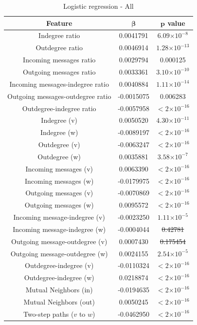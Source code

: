 \documentclass[conference]{IEEEtran}
\providecommand{\e}[1]{\ensuremath{\times 10^{#1}}}
\begin{document}
\begin{table}[!t]
\renewcommand{\arraystretch}{1.3}
\caption{Logistic regression - All}
\label{table_recresults_lograll3}
\centering
\begin{tabular}{|c||c|c|}
\hline
\bf{Feature} & $\mathbf{\beta}$ & $\mathbf{p}$ value \\
\hline
Indegree ratio     &    0.0041791  & $6.09\e{-8}$  \\
Outdegree ratio    & 0.0046914 & $1.28\e{-13}$ \\
Incoming messages ratio    &   0.0029794  & 0.000125 \\
Outgoing messages ratio   &   0.0033361  & $3.10\e{-10}$ \\
Incoming messages-indegree ratio & 0.0040884 &  $1.11\e{-14}$ \\
Outgoing messages-outdegree ratio &  -0.0015075 &  0.006283 \\
Outdegree-indegree ratio  &   -0.0057958 & $< 2 \e{-16} $\\
\hline
Indegree (v) & 0.0050520 & $ 4.30 \e{-11}$ \\
Indegree (w) & -0.0089197 & $<2 \e{-16} $ \\
Outdegree (v) & -0.0063247 & $<2 \e{-16}$ \\
Outdegree (w) & 0.0035881 & $3.58\e{-7}$ \\
Incoming messages (v) & 0.0063390 & $<2 \e{-16} $ \\
Incoming messages (w) & -0.0179975 & $<2 \e{-16} $ \\
Outgoing messages (v) & -0.0070869 & $<2 \e{-16} $\\
Outgoing messages (w) & 0.0095572 & $<2 \e{-16} $ \\
Incoming message-indegree (v) & -0.0023250 & $1.11\e{-5}$ \\
Incoming message-indegree (w) & -0.0004044 & \sout{0.42781} \\
Outgoing message-outdegree (v) & 0.0007430 & \sout{0.175454}  \\
Outgoing message-outdegree (w) & 0.0024155 & $2.54\e{-5}$ \\
Outdegree-indegree (v) & -0.0110324 & $<2 \e{-16} $ \\
Outdegree-indegree (w) & 0.0218874 & $<2 \e{-16} $ \\
\hline
Mutual Neighbors (in) &-0.0194635  &$< 2 \e{-16} $\\
Mutual Neighbors (out) &0.0050245  & $< 2 \e{-16} $\\
Two-step paths ($v$ to $w$)  &  -0.0462950   & $< 2 \e{-16} $\\

\end{tabular}
\end{table}
\end{document}
